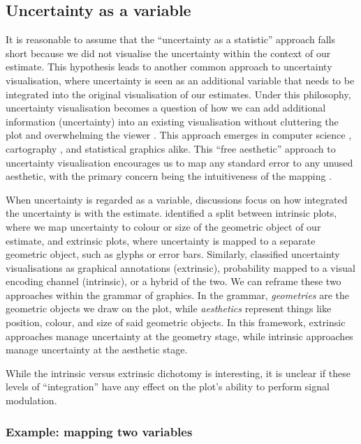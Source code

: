 \documentclass[]{ar-1col-S2O}
\begin{document}
\subsection{Uncertainty as a variable}\label{uncertainty-as-a-variable}

It is reasonable to assume that the ``uncertainty as a statistic''
approach falls short because we did not visualise the uncertainty within
the context of our estimate. This hypothesis leads to another common
approach to uncertainty visualisation, where uncertainty is seen as an
additional variable that needs to be integrated into the original
visualisation of our estimates. Under this philosophy, uncertainty
visualisation becomes a question of how we can add additional
information (uncertainty) into an existing visualisation without
cluttering the plot and overwhelming the viewer
\citep{Griethe2006, geointerviews}. This approach emerges in computer
science \citep{Kinkeldey2014}, cartography \citep{MacEachren2005}, and
statistical graphics \citep{Leland2005} alike. This ``free aesthetic''
approach to uncertainty visualisation encourages us to map any standard
error to any unused aesthetic, with the primary concern being the
intuitiveness of the mapping \citep{Maceachren2012}.

When uncertainty is regarded as a variable, discussions focus on how
integrated the uncertainty is with the estimate. \citet{Kinkeldey2014}
identified a split between intrinsic plots, where we map uncertainty to
colour or size of the geometric object of our estimate, and extrinsic
plots, where uncertainty is mapped to a separate geometric object, such
as glyphs or error bars. Similarly, \citet{uncertchap2022} classified
uncertainty visualisations as graphical annotations (extrinsic),
probability mapped to a visual encoding channel (intrinsic), or a hybrid
of the two. We can reframe these two approaches within the grammar of
graphics. In the grammar, \emph{geometries} are the geometric objects we
draw on the plot, while \emph{aesthetics} represent things like
position, colour, and size of said geometric objects. In this framework,
extrinsic approaches manage uncertainty at the geometry stage, while
intrinsic approaches manage uncertainty at the aesthetic stage.

While the intrinsic versus extrinsic dichotomy is interesting, it is
unclear if these levels of ``integration'' have any effect on the plot's
ability to perform signal modulation.

\subsubsection{Example: mapping two
variables}\label{example-mapping-two-variables}
\end{document}
